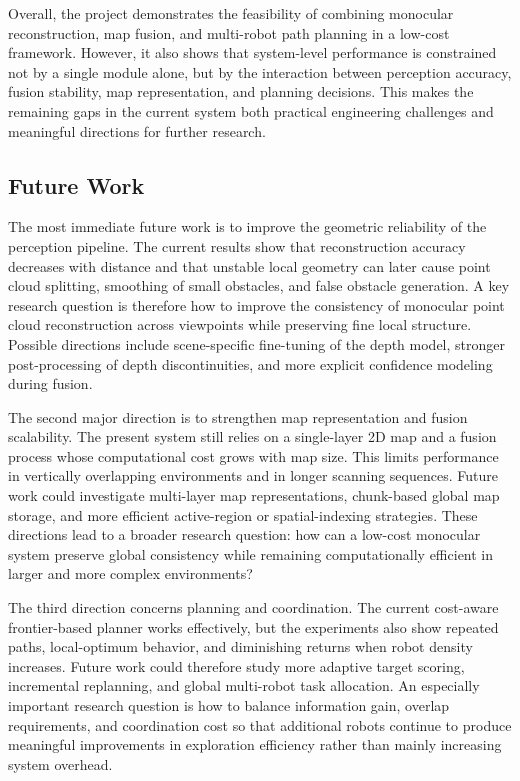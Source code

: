 \documentclass[12pt]{interim_report}
\begin{document}
Overall, the project demonstrates the feasibility of combining monocular reconstruction, map fusion, and multi-robot path planning in a low-cost framework. However, it also shows that system-level performance is constrained not by a single module alone, but by the interaction between perception accuracy, fusion stability, map representation, and planning decisions. This makes the remaining gaps in the current system both practical engineering challenges and meaningful directions for further research.

\subsection{Future Work}
\label{subsec:future-work-qingzhou-zhang}

The most immediate future work is to improve the geometric reliability of the perception pipeline. The current results show that reconstruction accuracy decreases with distance and that unstable local geometry can later cause point cloud splitting, smoothing of small obstacles, and false obstacle generation. A key research question is therefore how to improve the consistency of monocular point cloud reconstruction across viewpoints while preserving fine local structure. Possible directions include scene-specific fine-tuning of the depth model, stronger post-processing of depth discontinuities, and more explicit confidence modeling during fusion.

The second major direction is to strengthen map representation and fusion scalability. The present system still relies on a single-layer 2D map and a fusion process whose computational cost grows with map size. This limits performance in vertically overlapping environments and in longer scanning sequences. Future work could investigate multi-layer map representations, chunk-based global map storage, and more efficient active-region or spatial-indexing strategies. These directions lead to a broader research question: how can a low-cost monocular system preserve global consistency while remaining computationally efficient in larger and more complex environments?

The third direction concerns planning and coordination. The current cost-aware frontier-based planner works effectively, but the experiments also show repeated paths, local-optimum behavior, and diminishing returns when robot density increases. Future work could therefore study more adaptive target scoring, incremental replanning, and global multi-robot task allocation. An especially important research question is how to balance information gain, overlap requirements, and coordination cost so that additional robots continue to produce meaningful improvements in exploration efficiency rather than mainly increasing system overhead.
\end{document}
